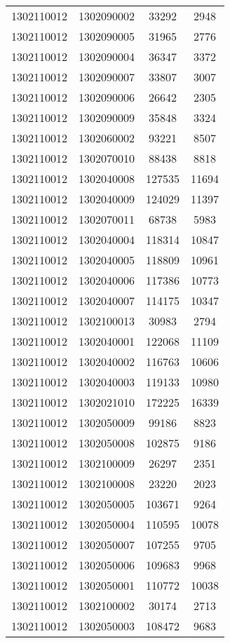 \begin{longtable}[h]{llcc}
		1302110012 & 1302090002 & 33292 & 2948\\
		1302110012 & 1302090005 & 31965 & 2776\\
		1302110012 & 1302090004 & 36347 & 3372\\
		1302110012 & 1302090007 & 33807 & 3007\\
		1302110012 & 1302090006 & 26642 & 2305\\
		1302110012 & 1302090009 & 35848 & 3324\\
		1302110012 & 1302060002 & 93221 & 8507\\
		1302110012 & 1302070010 & 88438 & 8818\\
		1302110012 & 1302040008 & 127535 & 11694\\
		1302110012 & 1302040009 & 124029 & 11397\\
		1302110012 & 1302070011 & 68738 & 5983\\
		1302110012 & 1302040004 & 118314 & 10847\\
		1302110012 & 1302040005 & 118809 & 10961\\
		1302110012 & 1302040006 & 117386 & 10773\\
		1302110012 & 1302040007 & 114175 & 10347\\
		1302110012 & 1302100013 & 30983 & 2794\\
		1302110012 & 1302040001 & 122068 & 11109\\
		1302110012 & 1302040002 & 116763 & 10606\\
		1302110012 & 1302040003 & 119133 & 10980\\
		1302110012 & 1302021010 & 172225 & 16339\\
		1302110012 & 1302050009 & 99186 & 8823\\
		1302110012 & 1302050008 & 102875 & 9186\\
		1302110012 & 1302100009 & 26297 & 2351\\
		1302110012 & 1302100008 & 23220 & 2023\\
		1302110012 & 1302050005 & 103671 & 9264\\
		1302110012 & 1302050004 & 110595 & 10078\\
		1302110012 & 1302050007 & 107255 & 9705\\
		1302110012 & 1302050006 & 109683 & 9968\\
		1302110012 & 1302050001 & 110772 & 10038\\
		1302110012 & 1302100002 & 30174 & 2713\\
		1302110012 & 1302050003 & 108472 & 9683\\

\end{longtable}
